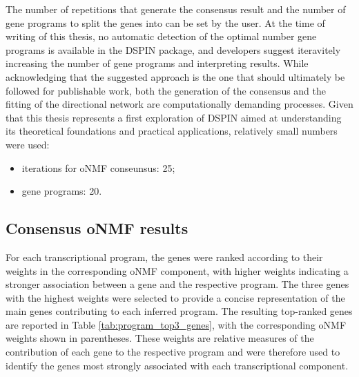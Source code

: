\documentclass[11pt,a4paper]{article}
\begin{document}
The number of repetitions that generate the consensus result and the number of gene programs to split the genes into can be set by the user. At the time of writing of this thesis, no automatic detection of the optimal number gene programs is available in the DSPIN package, and developers suggest iteravitely increasing the number of gene programs and interpreting results. While acknowledging that the suggested approach is the one that should ultimately be followed for publishable work, both the generation of the consensus and the fitting of the directional network are computationally demanding processes. Given that this thesis represents a first exploration of DSPIN aimed at understanding its theoretical foundations and practical applications, relatively small numbers were used:

\begin{itemize}
	\item iterations for oNMF conseunsus: 25;
	\item gene programs: 20.
\end{itemize}

\subsection{Consensus oNMF results}

For each transcriptional program, the genes were ranked according to their weights in the corresponding oNMF component, with higher weights indicating a stronger association between a gene and the respective program. The three genes with the highest weights were selected to provide a concise representation of the main genes contributing to each inferred program. The resulting top-ranked genes are reported in Table \ref{tab:program_top3_genes}, with the corresponding oNMF weights shown in parentheses. These weights are relative measures of the contribution of each gene to the respective program and were therefore used to identify the genes most strongly associated with each transcriptional component.
\end{document}
